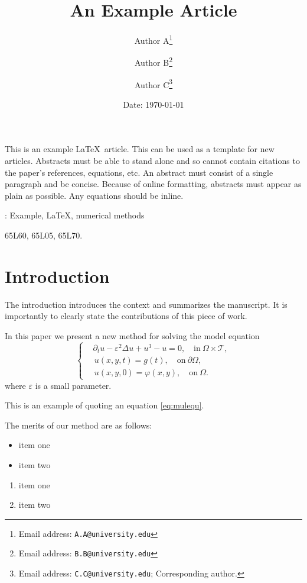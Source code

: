 \documentclass[10pt,reqno,final]{article}
\title{An Example Article}
\author[1]{Author A\thanks{Email address: \texttt{A.A@university.edu}}}
\author[1]{Author B\thanks{Email address: \texttt{B.B@university.edu}}}
\author[2]{Author C\thanks{Email address: \texttt{C.C@university.edu}; Corresponding author.}}
\affil[1]{Department of Mathematics, \LaTeX\ University}
\affil[2]{Department of Mechanical Engineering, \LaTeX\ University}
\date{Date: \today}
\makeatletter
\theoremstyle{plain}
\theoremstyle{definition}
\theoremstyle{remark}
\numberwithin{equation}{section}
\numberwithin{figure}{section}
\numberwithin{table}{section}
\renewenvironment{abstract}{%
  \if@twocolumn
    \section*{\abstractname}%
  \else %
    \begin{center}%
      {\bfseries \large\abstractname\vspace{\z@}} %
    \end{center}%
    \quotation
  \fi}{
  \if@twocolumn\else\endquotation\fi
}
\makeatother
\begin{document}
\maketitle

\begin{abstract}
  This is an example \LaTeX\ article. This can be used as a
  template for new articles.  Abstracts must be able to stand alone
  and so cannot contain citations to the paper's references,
  equations, etc.  An abstract must consist of a single paragraph and
  be concise. Because of online formatting, abstracts must appear as
  plain as possible. Any equations should be inline.

  \medskip
  : Example, \LaTeX, numerical methods

  \medskip
   65L60, 65L05, 65L70.
\end{abstract}



\section{Introduction}
The introduction introduces the context and summarizes the
manuscript. It is importantly to clearly state the contributions of
this piece of work.

In this paper we present a new method for solving the model equation
\begin{equation}\label{eq:mulequ}
\left\{\begin{aligned}
  & \partial_{t} u-\varepsilon^{2} \Delta u+u^{3}-u=0, \quad \text{in} ~\Omega\times\mathcal{T}, \\
  &\, u(x,y,t) = g(t), \quad \text{on} ~ \partial \Omega, \\
  &\, u(x,y,0)=\varphi(x, y), \quad \text{on} ~\Omega.
\end{aligned}\right.
\end{equation}
where $\varepsilon$ is a small parameter.

This is an example of quoting an equation \eqref{eq:mulequ}.

The merits of our method are as follows:
\begin{itemize}
  \item item one
  \item item two
\end{itemize}
\begin{enumerate}
  \item item one
  \item item two
\end{enumerate}
\end{document}
